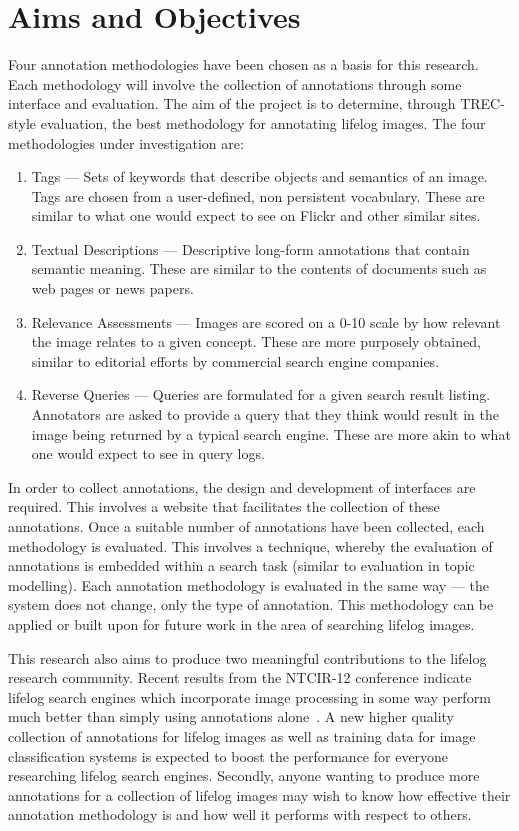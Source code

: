 \section{Aims and Objectives}

Four annotation methodologies have been chosen as a basis for this research. Each methodology will involve the collection of annotations through some interface and evaluation. The aim of the project is to determine, through TREC-style evaluation, the best methodology for annotating lifelog images. The four methodologies under investigation are: 

\begin{enumerate}
    \item Tags --- Sets of keywords that describe objects and semantics of an image. Tags are chosen from a user-defined, non persistent vocabulary. These are similar to what one would expect to see on Flickr and other similar sites.
    \item Textual Descriptions --- Descriptive long-form annotations that contain semantic meaning. These are similar to the contents of documents such as web pages or news papers.
    \item Relevance Assessments --- Images are scored on a 0-10 scale by how relevant the image relates to a given concept. These are more purposely obtained, similar to editorial efforts by commercial search engine companies.
    \item Reverse Queries --- Queries are formulated for a given search result listing. Annotators are asked to provide a query that they think would result in the image being returned by a typical search engine. These are more akin to what one would expect to see in query logs.
\end{enumerate}

In order to collect annotations, the design and development of interfaces are required. This involves a website that facilitates the collection of these annotations. Once a suitable number of annotations have been collected, each methodology is evaluated. This involves a technique, whereby the evaluation of annotations is embedded within a search task (similar to evaluation in topic modelling). Each annotation methodology is evaluated in the same way --- the system does not change, only the type of annotation. This methodology can be applied or built upon for future work in the area of searching lifelog images.

This research also aims to produce two meaningful contributions to the lifelog research community. Recent results from the NTCIR-12 conference indicate lifelog search engines which incorporate image processing in some way perform much better than simply using annotations alone~\cite{safadilig2016ligmrim}. A new higher quality collection of annotations for lifelog images as well as training data for image classification systems is expected to boost the performance for everyone researching lifelog search engines. Secondly, anyone wanting to produce more annotations for a collection of lifelog images may wish to know how effective their annotation methodology is and how well it performs with respect to others.

